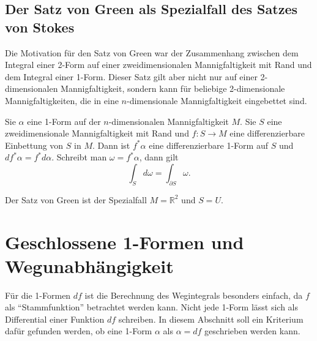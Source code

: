 %
%
\subsection{Der Satz von Green als Spezialfall des Satzes von Stokes}
Die Motivation für den Satz von Green war der Zusammenhang zwischen
dem Integral einer 2-Form auf einer zweidimensionalen Mannigfaltigkeit
mit Rand und dem Integral einer 1-Form.
Dieser Satz gilt aber nicht nur auf einer 2-dimensionalen Mannigfaltigkeit,
sondern kann für beliebige 2-dimensionale Mannigfaltigkeiten, die in
eine $n$-dimensionale Mannigfaltigkeit eingebettet sind.

\begin{satz}[Stokes]
Sie $\alpha$ eine 1-Form auf der $n$-dimensionalen Mannigfaltigkeit $M$.
Sie $S$ eine zweidimensionale Mannigfaltigkeit mit Rand und
$f\colon S\to M$ eine differenzierbare Einbettung von $S$ in $M$.
Dann ist $f^*\alpha$ eine differenzierbare 1-Form auf $S$ und
$df^*\alpha=f^*d\alpha$.
Schreibt man $\omega=f^*\alpha$,
dann gilt
\[
\int_S d\omega
=
\int_{\partial S}\omega.
\]
\end{satz}

Der Satz von Green ist der Spezialfall $M=\mathbb{R}^2$ und $S=U$.

%
%
\section{Geschlossene 1-Formen und Wegunabhängigkeit
\label{buch:green:section:geschlossen}}
Für die 1-Formen $df$ ist die Berechnung des Wegintegrals besonders
einfach, da $f$ als ``Stammfunktion'' betrachtet werden kann.
Nicht jede 1-Form lässt sich als Differential einer Funktion $df$ 
schreiben.
In diesem Abschnitt soll ein Kriterium dafür gefunden werden, 
ob eine 1-Form $\alpha$ als $\alpha=df$ geschrieben werden kann.

%
%
